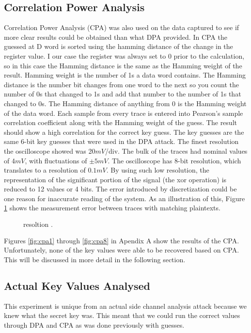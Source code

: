 \subsection{Correlation Power Analysis}
  Correlation Power Analysis (CPA) was also used on the data captured to see if more clear results could be obtained than what DPA provided.  In CPA the guessed at D word is sorted using the hamming distance of the change in the register value.  I our case the register was always set to 0 prior to the calculation, so in this case the Hamming distance is the same as the Hamming weight of the result.  Hamming weight is the number of 1s a data word contains.  The Hamming distance is the number bit changes from one word to the next so you count the number of 0s that changed to 1s and add that number to the number of 1s that changed to 0s.  The Hamming distance of anything from 0 is the Hamming weight of the data word.
  Each sample from every trace is entered into Pearson's sample correlation coefficient along with the Hamming weight of the guess.  The result should show a high correlation for the correct key guess.  The key guesses are the same 6-bit key guesses that were used in the DPA attack.
  The finest resolution the oscilloscope showed was 20$mV$/div. The bulk of the traces had nominal values of 4$mV$, with fluctuations of $\pm 5mV$. The oscilloscope has 8-bit resolution, which translates to a resolution of $0.1mV$. By using such low resolution, the representation of the significant portion of the signal (the xor operation) is reduced to 12 values or 4 bits. The error introduced by discretization could be one reason for inaccurate reading of the system. As an illustration of this, Figure \ref{fig:res} shows the measurement error between traces with matching plaintexts. 

	\begin{figure}[h]
	
	\caption{	resoltion .}
	\label{fig:res}
	\end{figure}

  Figures \ref{fig:cpa1} through \ref{fig:cpa8} in Apendix A show the results of the CPA.  Unfortunately, none of the key values were able to be recovered based on CPA.  This will be discussed in more detail in the following section.

  
\subsection{Actual Key Values Analysed}
  This experiment is unique from an actual side channel analysis attack because we knew what the secret key was.  This meant that we could run the correct values through DPA and CPA as was done previously with guesses.  
  
